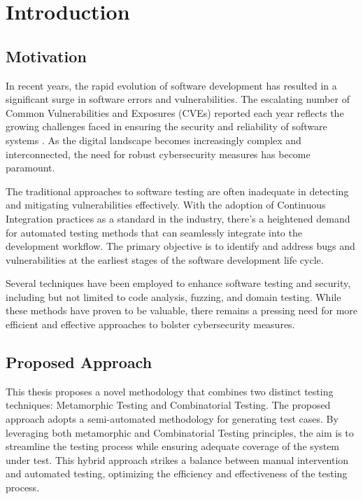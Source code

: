 \chapter{Introduction}
\label{chap:intro}

\section{Motivation}

In recent years, the rapid evolution of software development has resulted in a significant surge in software errors and vulnerabilities. The escalating number of Common Vulnerabilities and Exposures (CVEs) reported each year reflects the growing challenges faced in ensuring the security and reliability of software systems \cite{CVE}. As the digital landscape becomes increasingly complex and interconnected, the need for robust cybersecurity measures has become paramount.

The traditional approaches to software testing are often inadequate in detecting and mitigating vulnerabilities effectively. With the adoption of Continuous Integration practices as a standard in the industry, there's a heightened demand for automated testing methods that can seamlessly integrate into the development workflow. The primary objective is to identify and address bugs and vulnerabilities at the earliest stages of the software development life cycle.

Several techniques have been employed to enhance software testing and security, including but not limited to code analysis, fuzzing, and domain testing. While these methods have proven to be valuable, there remains a pressing need for more efficient and effective approaches to bolster cybersecurity measures.

\section{Proposed Approach}

This thesis proposes a novel methodology that combines two distinct testing techniques: Metamorphic Testing and Combinatorial Testing. The proposed approach adopts a semi-automated methodology for generating test cases. By leveraging both metamorphic and Combinatorial Testing principles, the aim is to streamline the testing process while ensuring adequate coverage of the system under test. This hybrid approach strikes a balance between manual intervention and automated testing, optimizing the efficiency and effectiveness of the testing process.

